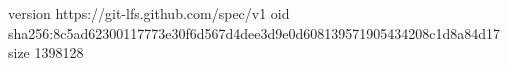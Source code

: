 version https://git-lfs.github.com/spec/v1
oid sha256:8c5ad62300117773e30f6d567d4dee3d9e0d608139571905434208c1d8a84d17
size 1398128
